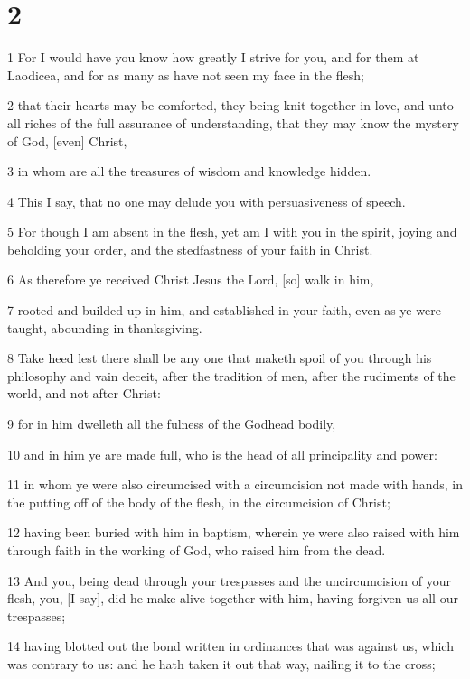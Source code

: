 \chapter{2}

\par 1 For I would have you know how greatly I strive for you, and for them at Laodicea, and for as many as have not seen my face in the flesh;
\par 2 that their hearts may be comforted, they being knit together in love, and unto all riches of the full assurance of understanding, that they may know the mystery of God, [even] Christ,
\par 3 in whom are all the treasures of wisdom and knowledge hidden.
\par 4 This I say, that no one may delude you with persuasiveness of speech.
\par 5 For though I am absent in the flesh, yet am I with you in the spirit, joying and beholding your order, and the stedfastness of your faith in Christ.
\par 6 As therefore ye received Christ Jesus the Lord, [so] walk in him,
\par 7 rooted and builded up in him, and established in your faith, even as ye were taught, abounding in thanksgiving.
\par 8 Take heed lest there shall be any one that maketh spoil of you through his philosophy and vain deceit, after the tradition of men, after the rudiments of the world, and not after Christ:
\par 9 for in him dwelleth all the fulness of the Godhead bodily,
\par 10 and in him ye are made full, who is the head of all principality and power:
\par 11 in whom ye were also circumcised with a circumcision not made with hands, in the putting off of the body of the flesh, in the circumcision of Christ;
\par 12 having been buried with him in baptism, wherein ye were also raised with him through faith in the working of God, who raised him from the dead.
\par 13 And you, being dead through your trespasses and the uncircumcision of your flesh, you, [I say], did he make alive together with him, having forgiven us all our trespasses;
\par 14 having blotted out the bond written in ordinances that was against us, which was contrary to us: and he hath taken it out that way, nailing it to the cross;
